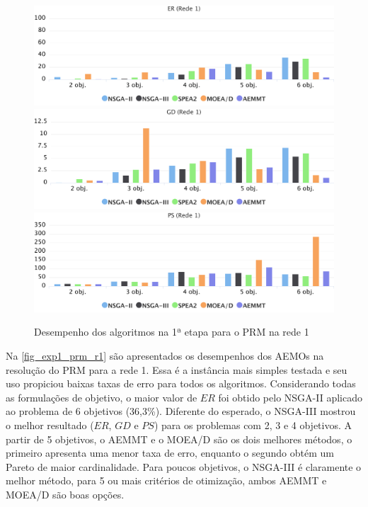 \begin{figure}[!htbp]
	\includegraphics[width=1\textwidth]{cap_experimentos/figs/etapa1/er-mrp-r1}
	\includegraphics[width=1\textwidth]{cap_experimentos/figs/etapa1/gd-mrp-r1}
	\includegraphics[width=1\textwidth]{cap_experimentos/figs/etapa1/ps-mrp-r1}
	\caption{\label{fig_exp1_prm_r1}Desempenho dos algoritmos na 1ª etapa para o PRM na rede 1}
\end{figure}

Na \autoref{fig_exp1_prm_r1} são apresentados os desempenhos dos AEMOs na resolução do PRM para a rede 1. Essa é a instância mais simples testada e seu uso propiciou baixas taxas de erro para todos os algoritmos. Considerando todas as formulações de objetivo, o maior valor de $ER$ foi obtido pelo NSGA-II aplicado ao problema de 6 objetivos (36,3\%). Diferente do esperado, o NSGA-III mostrou o melhor resultado ($ER$, $GD$ e $PS$) para os problemas com 2, 3 e 4 objetivos. A partir de 5 objetivos, o AEMMT e o MOEA/D são os dois melhores métodos, o primeiro apresenta uma menor taxa de erro, enquanto o segundo obtém um Pareto de maior cardinalidade. Para poucos objetivos, o NSGA-III é claramente o melhor método, para 5 ou mais critérios de otimização, ambos AEMMT e MOEA/D são boas opções.

